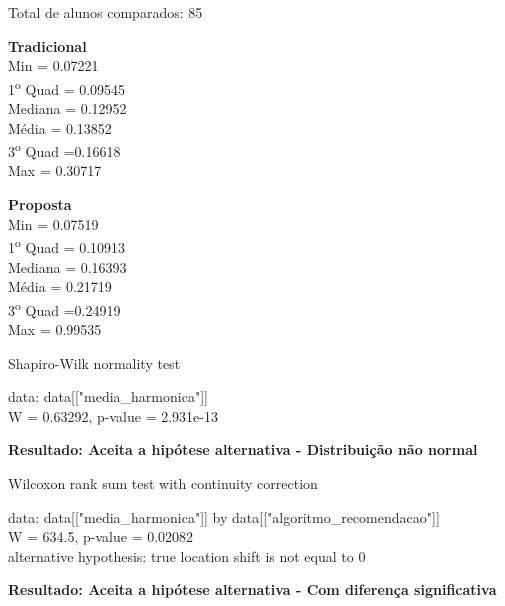 \noindent
Total de alunos comparados: 85

\begin{multicols}{2}

\noindent\textbf{Tradicional}\\
Min = 0.07221\\
1\textsuperscript{o} Quad = 0.09545\\
Mediana = 0.12952\\
Média = 0.13852\\
3\textsuperscript{o} Quad =0.16618\\
Max = 0.30717\\

\columnbreak

\noindent\textbf{Proposta}\\
Min = 0.07519\\
1\textsuperscript{o} Quad = 0.10913\\
Mediana = 0.16393\\
Média = 0.21719\\
3\textsuperscript{o} Quad =0.24919\\
Max = 0.99535
\end{multicols}

Shapiro-Wilk normality test

\noindent
data:  data[["media\_harmonica"]]\\
W = 0.63292, p-value = 2.931e-13

\noindent
\textbf{Resultado: Aceita a hipótese alternativa - Distribuição não normal}

Wilcoxon rank sum test with continuity correction

\noindent
data:  data[["media\_harmonica"]] by data[["algoritmo\_recomendacao"]]\\
W = 634.5, p-value = 0.02082\\
alternative hypothesis: true location shift is not equal to 0

\noindent
\textbf{Resultado: Aceita a hipótese alternativa - Com diferença significativa}

